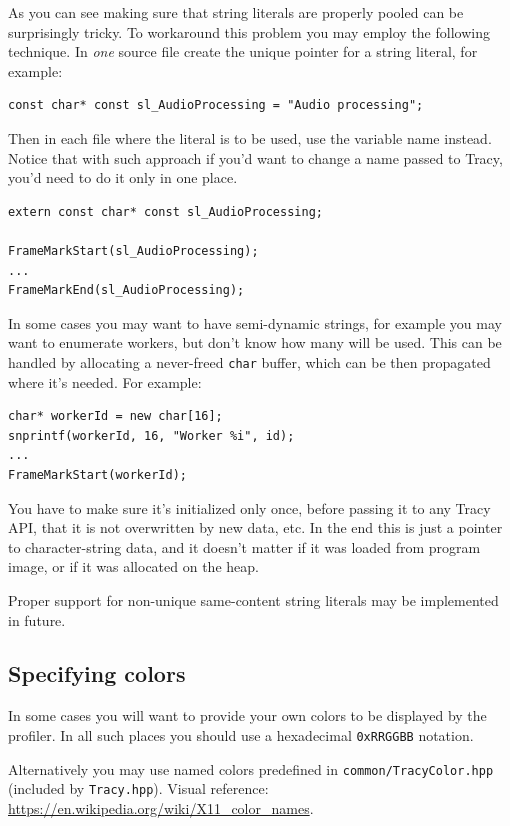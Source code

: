 \documentclass[hidelinks,titlepage,a4paper]{article}
\begin{document}
As you can see making sure that string literals are properly pooled can be surprisingly tricky. To workaround this problem you may employ the following technique. In \emph{one} source file create the unique pointer for a string literal, for example:

\begin{lstlisting}
const char* const sl_AudioProcessing = "Audio processing";
\end{lstlisting}

Then in each file where the literal is to be used, use the variable name instead. Notice that with such approach if you'd want to change a name passed to Tracy, you'd need to do it only in one place.

\begin{lstlisting}
extern const char* const sl_AudioProcessing;

FrameMarkStart(sl_AudioProcessing);
...
FrameMarkEnd(sl_AudioProcessing);
\end{lstlisting}

In some cases you may want to have semi-dynamic strings, for example you may want to enumerate workers, but don't know how many will be used. This can be handled by allocating a never-freed \texttt{char} buffer, which can be then propagated where it's needed. For example:

\begin{lstlisting}
char* workerId = new char[16];
snprintf(workerId, 16, "Worker %i", id);
...
FrameMarkStart(workerId);
\end{lstlisting}

You have to make sure it's initialized only once, before passing it to any Tracy API, that it is not overwritten by new data, etc. In the end this is just a pointer to character-string data, and it doesn't matter if it was loaded from program image, or if it was allocated on the heap.

Proper support for non-unique same-content string literals may be implemented in future.

\subsection{Specifying colors}

In some cases you will want to provide your own colors to be displayed by the profiler. In all such places you should use a hexadecimal \texttt{0xRRGGBB} notation.

Alternatively you may use named colors predefined in \texttt{common/TracyColor.hpp} (included by \texttt{Tracy.hpp}). Visual reference: \url{https://en.wikipedia.org/wiki/X11_color_names}.
\end{document}
